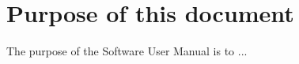 \section{Purpose of this document}
\label{Sec:SUM-Purpose-Scope}
The purpose of the Software User Manual is to ...
